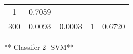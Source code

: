 \documentclass{ctexart}
\begin{document}
\begin{longtable}[]{@{}ccccc@{}}
\begin{minipage}[t]{0.15\columnwidth}
1\strut
\end{minipage} & \begin{minipage}[t]{0.14\columnwidth}\centering\strut
0.7059\strut
\end{minipage}\tabularnewline
\begin{minipage}[t]{0.16\columnwidth}\centering\strut
300\strut
\end{minipage} & \begin{minipage}[t]{0.21\columnwidth}\centering\strut
0.0093\strut
\end{minipage} & \begin{minipage}[t]{0.20\columnwidth}\centering\strut
0.0003\strut
\end{minipage} & \begin{minipage}[t]{0.15\columnwidth}\centering\strut
1\strut
\end{minipage} & \begin{minipage}[t]{0.14\columnwidth}\centering\strut
0.6720\strut
\end{minipage}\tabularnewline
\bottomrule
\end{longtable}

** Classifer 2 -SVM**
\end{document}

